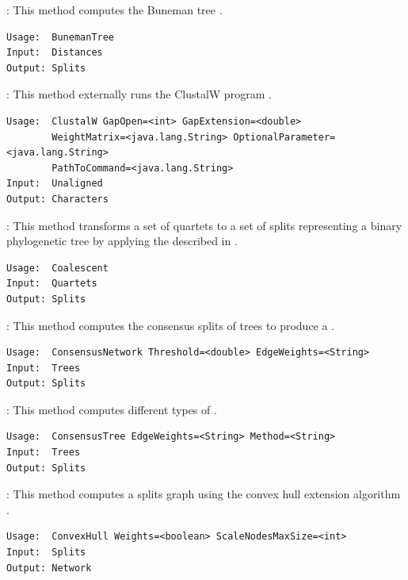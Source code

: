 \documentclass[11pt]{article}
\begin{document}
{}:
This method computes the Buneman tree \cite{buneman.dist}.
\begin{verbatim}
Usage:  BunemanTree
Input:  Distances
Output: Splits
\end{verbatim}

{}:
This method externally runs the ClustalW   program
\cite{ClustalW}.
\begin{verbatim}
Usage:  ClustalW GapOpen=<int> GapExtension=<double>
        WeightMatrix=<java.lang.String> OptionalParameter=<java.lang.String>
        PathToCommand=<java.lang.String>
Input:  Unaligned
Output: Characters
\end{verbatim}

{}:
This method transforms a set of quartets to a set of splits representing a
binary phylogenetic tree by applying the  described in
\cite{MosselSteel2003}.
\begin{verbatim}
Usage:  Coalescent
Input:  Quartets
Output: Splits
\end{verbatim}

{}:
This method computes the consensus splits of trees
\cite{MedianNetworks,HollandMoulton2003} to produce a .
\begin{verbatim}
Usage:  ConsensusNetwork Threshold=<double> EdgeWeights=<String>
Input:  Trees
Output: Splits
\end{verbatim}

{}:
This method  computes different types of .
\begin{verbatim}
Usage:  ConsensusTree EdgeWeights=<String> Method=<String>
Input:  Trees
Output: Splits
\end{verbatim}

{}:
This method computes a splits graph using the convex hull extension algorithm
\cite{DressHuson2004}.
\begin{verbatim}
Usage:  ConvexHull Weights=<boolean> ScaleNodesMaxSize=<int>
Input:  Splits
Output: Network
\end{verbatim}

\end{document}
